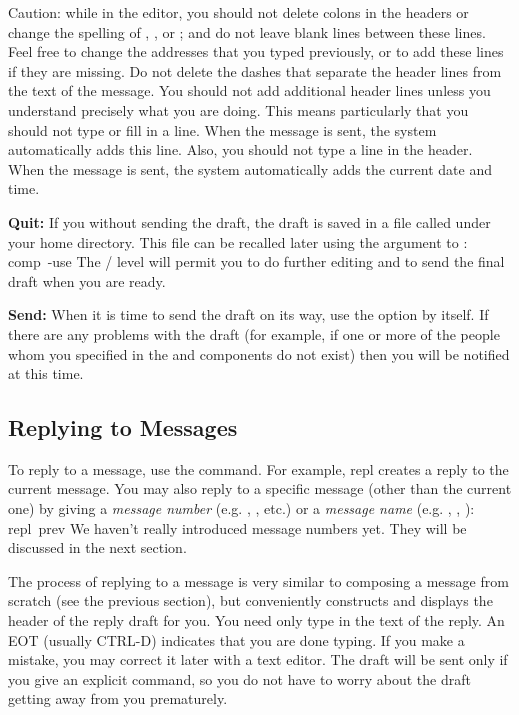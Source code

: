 Caution: while in the editor,
you should not delete colons in the headers
or change the spelling of , , or ;
and do not leave blank lines between these lines.
Feel free to change the addresses that you typed previously,
or to add these lines if they are missing.
Do not delete the dashes that separate the header lines from
the text of the message.
You should not add additional header lines unless you understand
precisely what you are doing.  
This means particularly that you should not type or fill in a 
line.
When the message is sent, the system automatically adds this line.
Also, you should not type a  line in the header.
When the message is sent, the system automatically adds the current
date and time.

{\bf Quit:}
If you  without sending the draft,
the draft is saved in a file called  under your
home directory.
This file can be recalled later using the  argument
to :
\example comp\ -use\endexample
The \whatnow/ level will permit you to do further editing
and to send the final draft when you are ready.

{\bf Send:}
When it is time to send the draft on its way,
use the  option by itself.
If there are any problems with the draft 
(for example,
if one or more of the people whom you specified in the  and 
components do not exist)
then you will be notified at this time.

\subsection{Replying to Messages}
To reply to a message,
use the  command.
For example,
\example repl\endexample
creates a reply to the current message.
You may also reply to a specific message (other than the current one)
by giving a {\it message number} (e.g. , , etc.)
or a {\it message name} (e.g. , , ):
\example repl\ prev\endexample
We haven't really introduced message numbers yet.
They will be discussed in the next section.

The process of replying to a message is very similar to composing
a message from scratch (see the previous section),
but  conveniently constructs and displays the header
of the reply draft for you.
You need only type in the text of the reply.
An EOT (usually CTRL-D) indicates that you are done typing.
If you make a mistake, you may correct it later with a text editor.
The draft will be sent only if you give an explicit  command,
so you do not have to worry about the draft getting away from you
prematurely.

